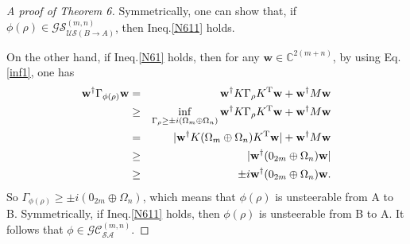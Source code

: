 \documentclass[10pt,aps,pra,amsfonts,amssymb,amsmath,%
floatfix,nofootinbib, groupedaddress,superscriptaddress,citesort,twocolumn
]{revtex4}%
\begin{document}
\begin{proof}[A proof of Theorem 6]
	Symmetrically,  one can show that, if $\phi(\rho)\in{\mathcal {GS}}^{(m,n)}_{\mathcal {US}(B \rightarrow A)}$,  then Ineq.\eqref{N611} holds.
	
	On the other hand, if Ineq.\eqref{N61} holds, then for any $ \mathbf{w} \in \mathbb{C}^{2(m+n)}$, by using Eq.\eqref{inf1}, one has
	\begin{eqnarray*}
		\mathbf{w}^{\dag}\Gamma _{\phi ( \rho )}\mathbf{w}
		&=&\mathbf{w}^{\dag}K\Gamma_{\rho} {K^{\rm T}}\mathbf{w} +\mathbf{w}^{\dag} M \mathbf{w}\\
		&\ge& \inf_{\Gamma_{\rho} \ge  \pm i\left( {\Omega_m \oplus {\Omega _n}} \right) } \mathbf{w}^{\dag}K\Gamma_{\rho} {K^{\rm T}}\mathbf{w} +\mathbf{w}^{\dag} M \mathbf{w}\\
		&=& |\mathbf{w}^{\dag}K(\Omega_m \oplus \Omega _n)K^{\rm T}\mathbf{w}|+\mathbf{w}^{\dag}M\mathbf{w}  \\
		&\ge& |\mathbf{w}^{\dag} (0_{2m} \oplus \Omega _n)\mathbf{w}|\\
		&\geq& \pm i\mathbf{w}^{\dag} (0_{2m} \oplus \Omega _n)\mathbf{w} .
	\end{eqnarray*}
	So $\Gamma _{\phi ( \rho )}\ge \pm i(0_{2m} \oplus \Omega _n)$, which means that  $\phi(\rho)$ is unsteerable from A to B. 
Symmetrically, if Ineq.\eqref{N611} holds, then $\phi(\rho)$ is unsteerable from B to A.
	It follows  that $\phi \in {\mathcal {GC}}^{(m,n)}_{\mathcal {SA}}$.
\end{proof}
\end{document}

